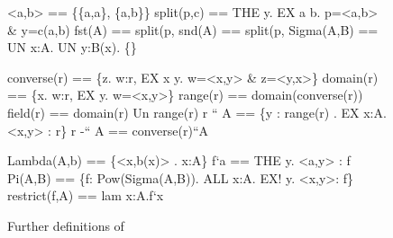 \begin{figure}
\begin{ttbox}
       <a,b>      == \{\{a,a\}, \{a,b\}\}
      split(p,c) == THE y. EX a b. p=<a,b> & y=c(a,b)
        fst(A)     == split(p, %
        snd(A)     == split(p, %
      Sigma(A,B) == UN x:A. UN y:B(x). \{<x,y>\}

   converse(r) == \{z. w:r, EX x y. w=<x,y> & z=<y,x>\}
     domain(r)   == \{x. w:r, EX y. w=<x,y>\}
      range(r)    == domain(converse(r))
      field(r)    == domain(r) Un range(r)
      r `` A      == \{y : range(r) . EX x:A. <x,y> : r\}
     r -`` A     == converse(r)``A

    Lambda(A,b) == \{<x,b(x)> . x:A\}
  f`a         == THE y. <a,y> : f
     Pi(A,B) == \{f: Pow(Sigma(A,B)). ALL x:A. EX! y. <x,y>: f\}
   restrict(f,A) == lam x:A.f`x
\end{ttbox}
\caption{Further definitions of {\ZF}} \label{ZF-defs}
\end{figure}



